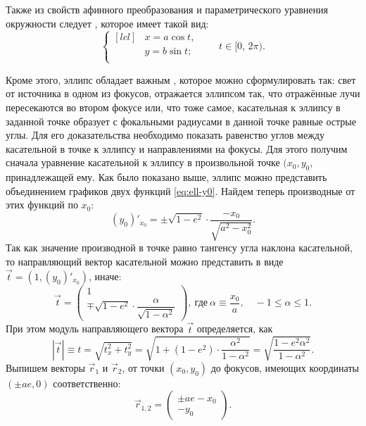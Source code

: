 Также из свойств афинного преобразования и параметрического уравнения окружности следует , которое имеет такой вид:
\begin{equation}
	\left\{
	\begin{aligned}[lcl]
		&x=a\cos t,\\
		&y=b\sin t;\\
	\end{aligned}
	\right. \quad\quad t \in [0, \, 2\pi).
\end{equation}

Кроме этого, эллипс обладает важным , которое можно сформулировать так: свет от источника в одном из фокусов, отражается эллипсом так, что отражённые лучи пересекаются во втором фокусе или, что тоже самое, касательная к эллипсу в заданной точке образует с фокальными радиусами в данной точке равные острые углы. Для его доказательства необходимо показать равенство углов между касательной в точке к эллипсу и направлениями на фокусы. Для этого получим сначала уравнение касательной к эллипсу в произвольной точке $(x_0, y_0$, принадлежащей ему. Как было показано выше, эллипс можно представить объединением графиков двух функций \eqref{eq:ell-y0}. Найдем теперь производные от этих функций по $x_0$:
\begin{equation*}
	(y_0)'_{x_0} = \pm \sqrt{1 - e^2} \cdot \frac{-x_0}{\sqrt{a^2 - x_0^2}}.
\end{equation*}
Так как значение производной в точке равно тангенсу угла наклона касательной, то направляющий вектор касательной можно представить в виде $\vec{t} = \left(1,  (y_0)'_{x_0}\right)$, иначе:
\begin{equation*}
	\vec t =
	\begin{pmatrix}
		1\\
		\mp \sqrt{1 - e^2} \cdot \dfrac{\alpha}{\sqrt{1 - \alpha^2}}
	\end{pmatrix},~\text{где}~ \alpha \equiv \frac{x_0}{a},\quad -1 \leqslant \alpha \leqslant 1.
\end{equation*}
При этом модуль направляющего вектора $\vec t$ определяется, как
\begin{equation*}
	|\vec t| \equiv t = \sqrt{t_x^2 + t_y^2} = \sqrt{1 + (1 - e^2) \cdot \frac{\alpha^2}{1 - \alpha^2}} = \sqrt{\frac{1 - e^2 \alpha^2}{1 - \alpha^2}}.
\end{equation*}
Выпишем векторы $\vec r_1$ и $\vec r_2$, от точки $(x_0, y_0)$ до фокусов, имеющих координаты $(\pm ae, 0)$ соответственно:
\begin{equation*}
	\vec r_{1,2} =
	\begin{pmatrix}
		\pm ae - x_0\\
		-y_0
	\end{pmatrix}.
\end{equation*}

